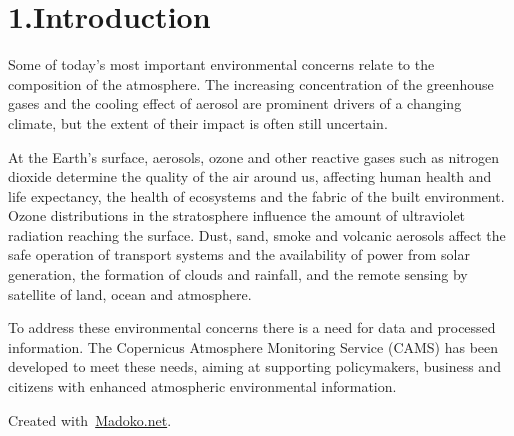 \documentclass[9pt]{report}
\begin{document}
\mdxtitleblockstart{}
\mdxauthorstart{}
\mdxauthorend\mdtitleauthorrunning{}{}\mdxtitleblockend%

\section{1.\hspace*{0.5em}Introduction}\label{sec-introduction}%

\noindent{}Some of today’s most important environmental concerns relate to the 
composition of the atmosphere. The increasing concentration of the 
greenhouse gases and the cooling effect of aerosol are prominent 
drivers of a changing climate, but the extent of their impact is 
often still uncertain.%

At the Earth’s surface, aerosols, ozone and other reactive gases such as 
nitrogen dioxide determine the quality of the air around us, affecting 
human health and life expectancy, the health of ecosystems and the 
fabric of the built environment. Ozone distributions in the stratosphere 
influence the amount of ultraviolet radiation reaching the surface. 
Dust, sand, smoke and volcanic aerosols affect the safe operation of 
transport systems and the availability of power from solar generation, 
the formation of clouds and rainfall, and the remote sensing by satellite 
of land, ocean and atmosphere.%

To address these environmental concerns there is a need for data and 
processed information. The Copernicus Atmosphere Monitoring Service (CAMS) 
has been developed to meet these needs, aiming at supporting policymakers, 
business and citizens with enhanced atmospheric environmental information.%

\begin{mdbmargintb}{4em}{}%
\begin{mdflushright}%
{\tiny{}Created with~\href{https://www.madoko.net}{Madoko.net}.}%
\end{mdflushright}%
\end{mdbmargintb}%
\end{document}
